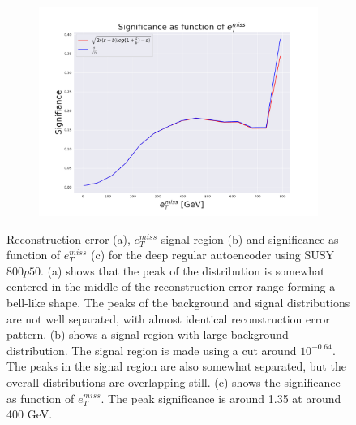 \begin{figure}[H]
    \begin{subfigure}{.40\textwidth}
        \includegraphics[width=\textwidth]{Figures/VAE_testing/big/2lep/significance_etmiss_800p0p050_-0.542414800898212.pdf}
        \caption{}
        \label{fig:VAE_2lep_big_signi_800_2}
    \end{subfigure}
    \hfill      
    \caption[2lep deep network | $800p50$ | VAE | 2]{Reconstruction error (a), $e_T^{miss}$ signal region (b) and significance as function of 
    $e_T^{miss}$ (c) for the deep regular autoencoder using SUSY $800p50$. 
    (a) shows that the peak of the distribution is somewhat centered in the middle 
    of the reconstruction error range forming a bell-like shape. The peaks of the background and signal 
    distributions are not well separated, with almost identical reconstruction error pattern. (b) 
    shows a signal region with large background distribution. The signal region is made using a cut around
    $10^{-0.64}$. The peaks in the signal region are also somewhat 
    separated, but the overall distributions are overlapping still. 
    (c) shows the significance as function of $e_T^{miss}$. 
    The peak significance is around 1.35 at around 400 GeV.}
    \label{fig:VAE_2lep_big_rec_sig_signi_800_2}
\end{figure}

